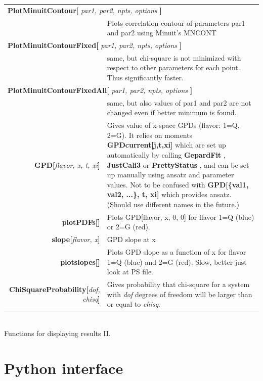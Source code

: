 \documentclass[12pt]{article}
\newcommand{\defboxitem}[3]{ {\ttfamily \bfseries #1[}\emph{#2}{\ttfamily \bfseries ]} & #3 }
\newcommand{\mmacomm}[1]{ {\ttfamily \bfseries #1} }
\begin{document}
\begin{flushleft}
\colorbox{defbox}{%
\begin{minipage}{\textwidth}%
\begin{tabular}{rp{8cm}}%
\multicolumn{2}{l}{\mmacomm{PlotMinuitContour[}\emph{par1, par2, npts, options}
\mmacomm{]} } \\
 & Plots correlation contour
of parameters par1 and par2 using Minuit's MNCONT \\[0.8ex]
\multicolumn{2}{l}{\mmacomm{PlotMinuitContourFixed[}\emph{par1, par2, npts, options}
\mmacomm{]} } \\
& same, but chi-square
is not minimized with respect to other parameters for each point. Thus
significantly faster. \\[0.8ex]
\multicolumn{2}{l}{\mmacomm{PlotMinuitContourFixedAll[}\emph{par1, par2, npts, options}
\mmacomm{]} } \\
& same, but
also values of par1 and par2 are not changed even if better minimum is found. \\[0.8ex]
\defboxitem{GPD}{flavor, x, t, xi}{Gives value of x-space GPDs (flavor: 1=Q, 2=G). 
It relies on moments \mmacomm{GPDcurrent[j,t,xi]} which are set up automatically
by calling \mmacomm{GepardFit}, \mmacomm{JustCali3} or \mmacomm{PrettyStatus}, and can
be set up manually using ansatz and parameter values. Not to be confused with
\mmacomm{GPD[\{val1, val2, ...\}, t, xi]} which provides ansatz. (Should use
different names in the future.)} \\[0.8ex]
\defboxitem{plotPDFs}{}{Plots GPD[flavor, x, 0, 0] for flavor 1=Q (blue) 
or 2=G (red).} \\[0.8ex]
\defboxitem{slope}{flavor, x}{GPD slope at x} \\[0.8ex]
\defboxitem{plotslopes}{}{Plots GPD slope as a function of x for flavor 1=Q (blue) and
 2=G (red). Slow, better just look at PS file.} \\[0.8ex]
\defboxitem{ChiSquareProbability}{dof, chisq}{Gives probability that chi-square
for a system with \emph{dof} degrees of freedom will be larger than or equal to \emph{chisq}.}
\end{tabular}%
\end{minipage}}\\[0.5ex]
{\small Functions for displaying results II.}
\end{flushleft}


\section{Python interface}
\end{document}
